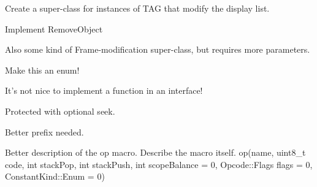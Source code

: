 \begin{DoxyRefList}
Create a super-\/class for instances of {\ttfamily T\+A\+G} that modify the display list.  
\item[\label{todo__todo000018}%
\hypertarget{todo__todo000018}{}%
Class \hyperlink{classjswf_1_1flash_1_1tags_1_1_remove_object2_tag}{jswf\+:\+:flash\+:\+:tags\+:\+:Remove\+Object2\+Tag} ]Implement {\ttfamily Remove\+Object}  
\item[\label{todo__todo000019}%
\hypertarget{todo__todo000019}{}%
Class \hyperlink{classjswf_1_1flash_1_1tags_1_1_show_frame_tag}{jswf\+:\+:flash\+:\+:tags\+:\+:Show\+Frame\+Tag} ]Also some kind of Frame-\/modification super-\/class, but requires more parameters.  
\item[\label{todo__todo000020}%
\hypertarget{todo__todo000020}{}%
Member \hyperlink{classjswf_1_1flash_1_1tags_1_1_tag_a3152409242986a8c0c89156f1dabc5e2}{jswf\+:\+:flash\+:\+:tags\+:\+:Tag\+:\+:type} ]Make this an enum!  
\item[\label{todo__todo000021}%
\hypertarget{todo__todo000021}{}%
Class \hyperlink{classjswf_1_1flash_1_1tags_1_1_tag_with_character}{jswf\+:\+:flash\+:\+:tags\+:\+:Tag\+With\+Character} ]It's not nice to implement a function in an interface!  
\item[\label{todo__todo000022}%
\hypertarget{todo__todo000022}{}%
Member \hyperlink{classjswf_1_1io_1_1_generic_reader_a29dcfa1317485ea04e6caef568e803ce}{jswf\+:\+:io\+:\+:Generic\+Reader\+:\+:pos} ]Protected with optional seek.  
\item[\label{todo__todo000023}%
\hypertarget{todo__todo000023}{}%
File \hyperlink{macros_8h}{macros.h} ]Better prefix needed.  
\item[\label{todo__todo000008}%
\hypertarget{todo__todo000008}{}%
File \hyperlink{ops-macro_8h}{ops-\/macro.h} ]Better description of the op macro. Describe the macro itself. {\ttfamily op(name, uint8\+\_\+t code, int stack\+Pop, int stack\+Push, int scope\+Balance = 0, Opcode\+::\+Flags flags = 0, Constant\+Kind\+::\+Enum = 0)} 
\end{DoxyRefList}